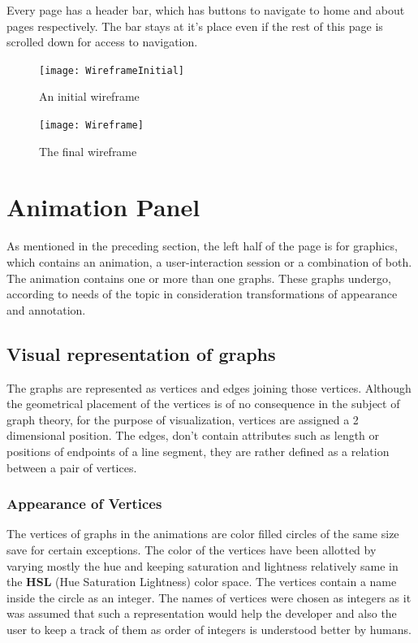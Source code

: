 Every page has a header bar, which has buttons to navigate to home and about
pages respectively. The bar stays at it's place even if the rest of this
page is scrolled down for access to navigation.
\begin{figure}[H]
    \centering
    \begin{minipage}{.5\textwidth}
        \centering
        \texttt{[image: WireframeInitial]}
        \caption{An initial wireframe}
        \label{fig:pubsub1}
    \end{minipage}%
    \begin{minipage}{.5\textwidth}
        \centering
        \texttt{[image: Wireframe]}
        \caption{The final wireframe}
        \label{fig:pubsub2}
    \end{minipage}
\end{figure}

\section{Animation Panel} 
As mentioned in the preceding section, the left half of the page is for
graphics, which contains an animation, a user-interaction session or a
combination of both.  The animation contains one or more than one graphs. These
graphs undergo, according to needs of the topic in consideration
transformations of appearance and annotation.

\subsection{Visual representation of graphs} 
The graphs are represented as vertices and edges joining those vertices.
Although the geometrical placement of the vertices is of no consequence in the
subject of graph theory, for the purpose of visualization, vertices are
assigned a 2 dimensional position. The edges, don't contain attributes such as
length or positions of endpoints of a line segment, they are rather defined as
a relation between a pair of vertices.

\subsubsection{Appearance of Vertices} 

The vertices of graphs in the animations are color filled circles of the
same size save for certain exceptions. The color of the vertices have been
allotted by varying mostly the hue and keeping saturation and lightness
relatively same in the \textbf{HSL} (Hue Saturation Lightness) color space. The
vertices contain a name inside the circle as an integer. The names of vertices
were chosen as integers as it was assumed that such a representation would help
the developer and also the user to keep a track of them as order of integers
is understood better by humans.

